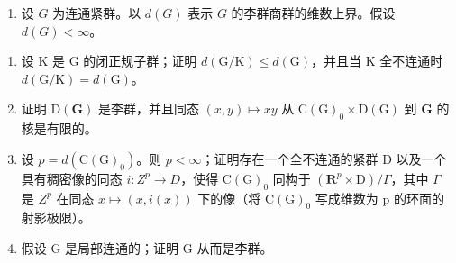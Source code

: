 
\begin{enumerate}
\def\labelenumi{\arabic{enumi})}
\tightlist
\item
  设 \(G\) 为连通紧群。以 \(d(G)\) 表示 \(G\) 的李群商群的维数上界。假设 \(d(G) < \infty\)。
\end{enumerate}

\begin{enumerate}
\def\labelenumi{\alph{enumi})}
\item
  设 K 是 G 的闭正规子群；证明 \(d(\mathrm{G}/\mathrm{K}) \leq d(\mathrm{G})\)，并且当 K 全不连通时 \(d(\mathrm{G}/\mathrm{K}) = d(\mathrm{G})\)。
\item
  证明 \(\mathrm{D}(\mathbf{G})\) 是李群，并且同态 \((x,y)\mapsto xy\) 从 \(\mathrm{C}(\mathrm{G})_0\times \mathrm{D}(\mathrm{G})\) 到 \(\mathbf{G}\) 的核是有限的。
\item
  设 \(p = d(\mathrm{C}(\mathrm{G})_{0})\)。则 \(p < \infty\)；证明存在一个全不连通的紧群 D 以及一个具有稠密像的同态 \(i : Z^{p} \to D\)，使得 \(\mathrm{C}(\mathrm{G})_{0}\) 同构于 \((\mathbf{R}^{p} \times \mathrm{D}) / \Gamma\)，其中 \(\Gamma\) 是 \(Z^{p}\) 在同态 \(x \mapsto (x, i(x))\) 下的像（将 \(\mathrm{C}(\mathrm{G})_{0}\) 写成维数为 p 的环面的射影极限）。
\item
  假设 G 是局部连通的；证明 G 从而是李群。
\end{enumerate}

